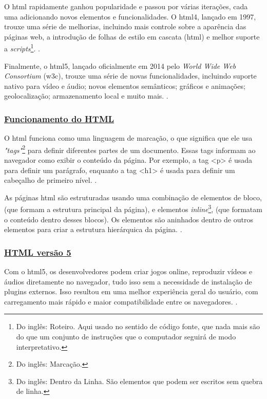 O
\acrshort{html}
rapidamente ganhou popularidade e passou por várias iterações, cada uma
adicionando novos elementos e funcionalidades. O
\acrshort{html}4,
lançado em 1997, trouxe uma
série de melhorias, incluindo mais controle sobre a aparência das páginas web, a introdução
de folhas de estilo em cascata
(\acrshort{html})
e melhor suporte a
\textit{scripts}\footnote{Do inglês: Roteiro. Aqui usado no sentido de código fonte, que nada mais são
    do que um conjunto de instruções que o computador seguirá de modo interpretativo.
}.
\cite{w3c}.

Finalmente, o
\acrshort{html}5,
lançado oficialmente em 2014 pelo
\textit{World Wide Web Consortium}
(\acrshort{w3c}), trouxe uma série de novas funcionalidades, incluindo suporte nativo para
vídeo e áudio; novos elementos semânticos; gráficos e animações; geolocalização;
armazenamento local e muito mais.
\cite{w3c}.

\subsubsection{\underline{Funcionamento do HTML}}

O
\acrshort{html}
funciona como uma linguagem de marcação, o que significa que ele usa
\textit{"tags"}\footnote{Do inglês: Marcação.
}
para definir diferentes partes de um documento. Essas tags informam ao navegador
como exibir o conteúdo da página. Por exemplo, a tag
<p>
é usada para definir um parágrafo,
enquanto a tag
<h1>
é usada para definir um cabeçalho de primeiro nível.
\cite{w3c}.

As páginas
\acrshort{html}
são estruturadas usando uma combinação de elementos de bloco,
(que formam a estrutura principal da página), e elementos
\textit{inline}\footnote{Do inglês: Dentro da Linha. São elementos que podem ser escritos sem quebra de linha.
},
(que formatam o conteúdo
dentro desses blocos). Os elementos são aninhados dentro de outros elementos para criar a
estrutura hierárquica da página.
\cite{w3c}.

\subsubsection{\underline{HTML versão 5}}

Com o
\acrshort{html}5,
os desenvolvedores podem criar jogos online, reproduzir vídeos e
áudios diretamente no navegador, tudo isso sem a necessidade de instalação de plugins
externos. Isso resultou em uma melhor experiência geral do usuário, com carregamento mais
rápido e maior compatibilidade entre os navegadores.
\cite{w3c}.

